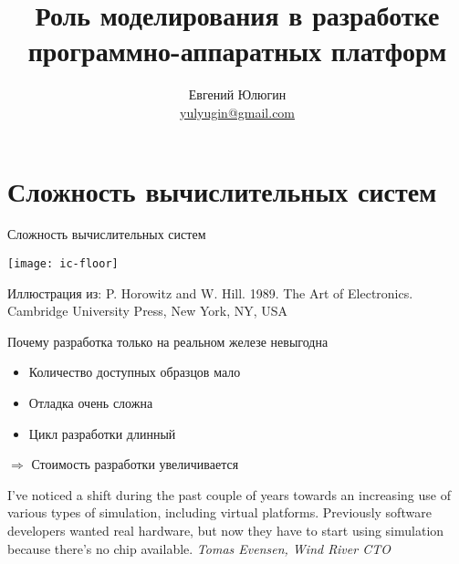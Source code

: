 

\title{Роль моделирования в разработке программно-аппаратных платформ}

\author[Евгений Юлюгин]{Евгений Юлюгин \\ \small{\href{mailto:yulyugin@gmail.com}{yulyugin@gmail.com}}}



\begin{frame}
    \maketitle
\end{frame}

\begin{frame}
    \tableofcontents
\end{frame}

\section{Сложность вычислительных систем}

\begin{frame}{Сложность вычислительных систем}

\centering
\texttt{[image: ic-floor]}

\tiny{Иллюстрация из: P. Horowitz and W. Hill. 1989. The Art of Electronics. Cambridge University Press, New York, NY, USA}

\end{frame}

\begin{frame}{Почему разработка только на реальном железе невыгодна }

\begin{itemize}
\item Количество доступных образцов мало
\item Отладка очень сложна
\item Цикл разработки длинный
\end{itemize}

$\Rightarrow$ Стоимость разработки увеличивается

\bigskip

\tiny{I've noticed a shift during the past couple of years towards an increasing use of various types of simulation, including virtual platforms. Previously software developers wanted real hardware, but now they have to start using simulation because there's no chip available. \textit{Tomas Evensen, Wind River CTO}}

\end{frame}

